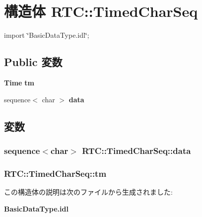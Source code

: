 \section{構造体 RTC::TimedCharSeq}
\label{structRTC_1_1TimedCharSeq}


{\ttfamily import \char`\"{}BasicDataType.idl\char`\"{};}

\subsection*{Public 変数}
\begin{DoxyCompactItemize}
\item 
{\bf Time} {\bf tm}
\item 
sequence$<$ char $>$ {\bf data}
\end{DoxyCompactItemize}


\subsection{変数}
\subsubsection[{data}]{\setlength{\rightskip}{0pt plus 5cm}sequence$<$char$>$ {\bf RTC::TimedCharSeq::data}}\label{structRTC_1_1TimedCharSeq_a56ac1b4edf9feed206c4f5dac3f39a76}
\subsubsection[{tm}]{ {\bf RTC::TimedCharSeq::tm}}\label{structRTC_1_1TimedCharSeq_adf1cef916575772777ad789c69311a2c}


この構造体の説明は次のファイルから生成されました:\begin{DoxyCompactItemize}
\item 
{\bf BasicDataType.idl}\end{DoxyCompactItemize}
